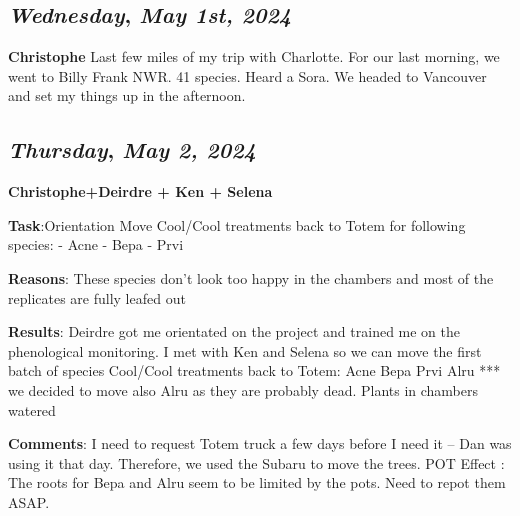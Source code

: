 \begin{center}
\section*{\month}
\end{center}

\def\day{\textit{May 1st, 2024}}
\def\weekday{\textit{Wednesday}}
\subsection*{\weekday, \day}
\textbf{Christophe}
Last few miles of my trip with Charlotte. For our last morning, we went to Billy Frank NWR. 41 species. Heard a Sora. 
We headed to Vancouver and set my things up in the afternoon. 

\def\day{\textit{May 2, 2024}}
\def\weekday{\textit{Thursday}}
\subsection*{\weekday, \day}
\textbf{Christophe+Deirdre + Ken + Selena}
\par 
\textbf {Task}:Orientation
Move Cool/Cool treatments back to Totem for following species:
- Acne
- Bepa
- Prvi
\par 
\textbf {Reasons}: These species don’t look too happy in the chambers and most of the replicates are fully leafed out
\par 
\textbf {Results}: Deirdre got me orientated on the project and trained me on the phenological monitoring.
I met with Ken and Selena so we can move the first batch of species Cool/Cool treatments back to Totem:
Acne
Bepa
Prvi
Alru
*** we decided to move also Alru as they are probably dead. 
Plants in chambers watered 
\par 
\textbf {Comments}: I need to request Totem truck a few days before I need it – Dan was using it that day. Therefore, we used the Subaru to move the trees. 
POT Effect : The roots for Bepa and Alru seem to be limited by the pots. Need to repot them ASAP. 

\def\day{\textit{May 3, 2024}}
\def\weekday{\textit{Friday}}
